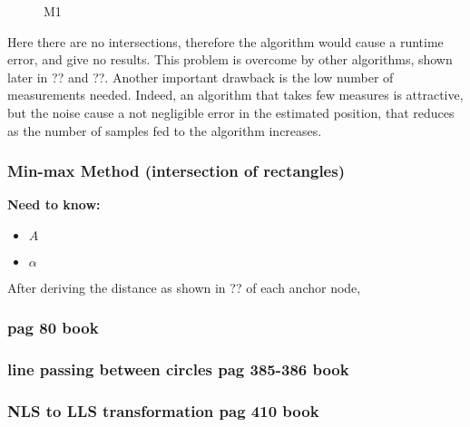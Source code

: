 \documentclass[12pt]{article}
\begin{document}
\begin{figure}
\centering
{}
\caption{M1} \label{fig:M1}
\end{figure}
Here there are no intersections, therefore the algorithm would cause a runtime error, and give no results. This problem is overcome by other algorithms, shown later in ?? and ??. Another important drawback is the low number of measurements needed. Indeed, an algorithm that takes few measures is attractive, but the noise cause a not negligible error in the estimated position, that reduces as the number of samples fed to the algorithm increases.

\subsubsection{Min-max Method (intersection of rectangles)}
  \begin{center}
  \textbf{Need to know:}
  \begin{itemize}
    \centering
    \item $A$
    \item $\alpha$
  \end{itemize}
  \end{center}
After deriving the distance as shown in ?? of each anchor node, 
\clearpage
\subsubsection{pag 80 book}
\subsubsection{line passing between circles pag 385-386 book}
\subsubsection{NLS to LLS transformation pag 410 book}
\end{document}
